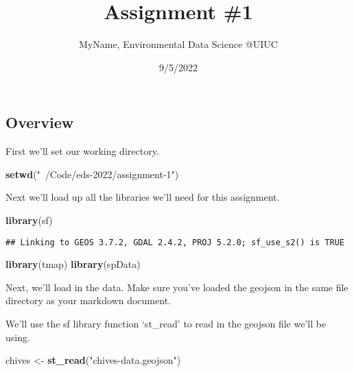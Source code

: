 \documentclass[]{tufte-handout}
\title{Assignment \#1}
\author{MyName, Environmental Data Science @UIUC}
\date{9/5/2022}
\newenvironment{Shaded}{}{}
\newcommand{\KeywordTok}[1]{\textcolor[rgb]{0.00,0.44,0.13}{\textbf{#1}}}
\newcommand{\NormalTok}[1]{#1}
\newcommand{\StringTok}[1]{\textcolor[rgb]{0.25,0.44,0.63}{#1}}
\begin{document}
\maketitle




\hypertarget{overview}{%
\subsection{Overview}\label{overview}}

First we'll set our working directory.

\begin{Shaded}
\begin{Highlighting}[]
\KeywordTok{setwd}\NormalTok{(}\StringTok{"~/Code/eds-2022/assignment-1"}\NormalTok{)}
\end{Highlighting}
\end{Shaded}

Next we'll load up all the libraries we'll need for this assignment.

\begin{Shaded}
\begin{Highlighting}[]
\KeywordTok{library}\NormalTok{(sf)}
\end{Highlighting}
\end{Shaded}

\begin{verbatim}
## Linking to GEOS 3.7.2, GDAL 2.4.2, PROJ 5.2.0; sf_use_s2() is TRUE
\end{verbatim}

\begin{Shaded}
\begin{Highlighting}[]
\KeywordTok{library}\NormalTok{(tmap)}
\KeywordTok{library}\NormalTok{(spData)}
\end{Highlighting}
\end{Shaded}

Next, we'll load in the data. Make sure you've loaded the geojson in the
same file directory as your markdown document.

We'll use the sf library function `st\_read' to read in the geojson file
we'll be using.

\begin{Shaded}
\begin{Highlighting}[]
\NormalTok{chives <-}\StringTok{ }\KeywordTok{st_read}\NormalTok{(}\StringTok{"chives-data.geojson"}\NormalTok{)}
\end{Highlighting}
\end{Shaded}
\end{document}

